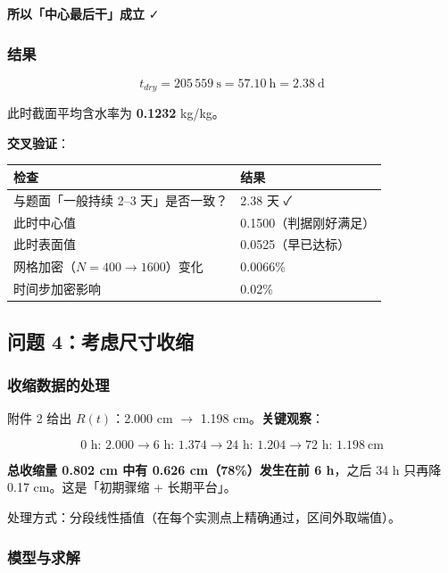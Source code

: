 \textbf{所以「中心最后干」成立} ✓


\subsubsection{结果}


\begin{equation}
t_{dry}=205\,559\ \mathrm s=57.10\ \mathrm h=2.38\ \mathrm d\tag{10.2}
\end{equation}


此时截面平均含水率为 \textbf{0.1232} kg/kg。


\textbf{交叉验证}：


\begin{center}
\small
\begin{tabular}{ll}
\toprule
检查 & 结果 \\
\midrule
与题面「一般持续 2–3 天」是否一致？ & 2.38 天 ✓ \\
此时中心值 & 0.1500（判据刚好满足） \\
此时表面值 & 0.0525（早已达标） \\
网格加密（$N=400\to1600$）变化 & 0.0066\% \\
时间步加密影响 & 0.02\% \\
\bottomrule
\end{tabular}
\end{center}


\subsection{问题 4：考虑尺寸收缩}


\subsubsection{收缩数据的处理}


附件 2 给出 $R(t)$：2.000 cm $\rightarrow$ 1.198 cm。\textbf{关键观察}：


\begin{equation*}
\text{0 h: }2.000\to\text{6 h: }1.374\to\text{24 h: }1.204\to\text{72 h: }1.198\ \mathrm{cm}
\end{equation*}


\textbf{总收缩量 0.802 cm 中有 0.626 cm（78\%）发生在前 6 h}，之后 34 h 只再降 0.17 cm。这是「初期骤缩 + 长期平台」。


处理方式：分段线性插值（在每个实测点上精确通过，区间外取端值）。


\subsubsection{模型与求解}


